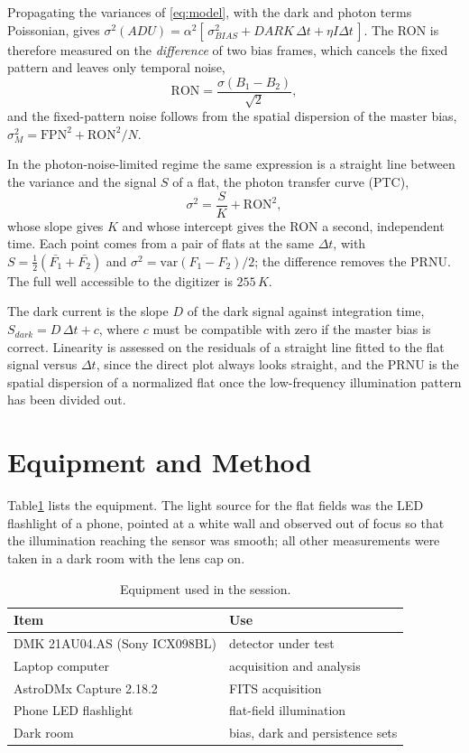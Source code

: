 \documentclass[conference]{IEEEtran}
\begin{document}
Propagating the variances of \eqref{eq:model}, with the dark and photon terms
Poissonian, gives $\sigma^2(ADU) = \alpha^2 [\,\sigma^2_{BIAS} + DARK\,\Delta t + \eta I \Delta t\,]$. The RON is therefore measured on the \emph{difference} of two bias frames, which cancels the fixed pattern and leaves only temporal noise,
\begin{equation}
\mathrm{RON} = \frac{\sigma(B_1 - B_2)}{\sqrt{2}} ,
\label{eq:ron}
\end{equation}
and the fixed-pattern noise follows from the spatial dispersion of the master bias, $\sigma^2_{M} = \mathrm{FPN}^2 + \mathrm{RON}^2/N$.

In the photon-noise-limited regime the same expression is a straight line between the variance and the signal $S$ of a flat, the photon transfer curve (PTC)\cite{janesick},
\begin{equation}
\sigma^2 = \frac{S}{K} + \mathrm{RON}^2 ,
\label{eq:ptc}
\end{equation}
whose slope gives $K$ and whose intercept gives the RON a second, independent time. Each point comes from a pair of flats at the same $\Delta t$, with $S = \tfrac{1}{2}(\bar{F_1}+\bar{F_2})$ and $\sigma^2 = \mathrm{var}(F_1-F_2)/2$; the difference removes the PRNU. The full well accessible to the digitizer is $255\,K$.

The dark current is the slope $D$ of the dark signal against integration time, $S_{dark} = D\,\Delta t + c$, where $c$ must be compatible with zero if the master bias is correct. Linearity is assessed on the residuals of a straight line fitted to the flat signal versus $\Delta t$, since the direct plot always looks straight, and the PRNU is the spatial dispersion of a normalized flat once the low-frequency illumination pattern has been divided out.

\section{Equipment and Method}
\label{sec:equip}

Table\ref{tab:equip} lists the equipment. The light source for the flat fields was the LED flashlight of a phone, pointed at a white wall and observed out of focus so that the illumination reaching the sensor was smooth; all other measurements were taken in a dark room with the lens cap on.

\begin{table}[htbp]
\caption{Equipment used in the session.}
\label{tab:equip}
\centering
\small
\begin{tabular}{@{}ll@{}}
\toprule
\textbf{Item} & \textbf{Use} \\
\midrule
DMK 21AU04.AS (Sony ICX098BL) & detector under test \\
Laptop computer & acquisition and analysis \\
AstroDMx Capture 2.18.2 & FITS acquisition \\
Phone LED flashlight & flat-field illumination \\
Dark room & bias, dark and persistence sets \\
\bottomrule
\end{tabular}
\end{table}
\end{document}
